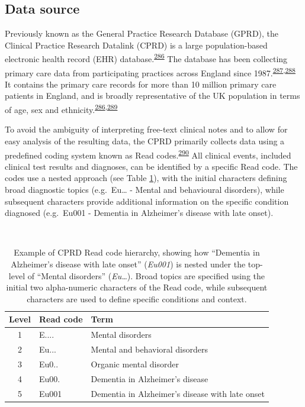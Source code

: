 \documentclass[a4paper, twoside]{templates/ociamthesis}
\begin{document}
\hypertarget{cprd-data-source}{%
\subsection{Data source}\label{cprd-data-source}}

Previously known as the General Practice Research Database (GPRD), the Clinical Practice Research Datalink (CPRD) is a large population-based electronic health record (EHR) database.\textsuperscript{\protect\hyperlink{ref-herrett2015}{286}} The database has been collecting primary care data from participating practices across England since 1987.\textsuperscript{\protect\hyperlink{ref-williams2012}{287},\protect\hyperlink{ref-wood2001revitalizing}{288}} It contains the primary care records for more than 10 million primary care patients in England, and is broadly representative of the UK population in terms of age, sex and ethnicity.\textsuperscript{\protect\hyperlink{ref-herrett2015}{286},\protect\hyperlink{ref-mathur2014}{289}}

To avoid the ambiguity of interpreting free-text clinical notes and to allow for easy analysis of the resulting data, the CPRD primarily collects data using a predefined coding system known as Read codes.\textsuperscript{\protect\hyperlink{ref-booth1994}{290}} All clinical events, included clinical test results and diagnoses, can be identified by a specific Read code. The codes use a nested approach (see Table \ref{tab:readExample-table}), with the initial characters defining broad diagnostic topics (e.g.~Eu\ldots{} - Mental and behavioural disorders), while subsequent characters provide additional information on the specific condition diagnosed (e.g.~Eu001 - Dementia in Alzheimer's disease with late onset).

~





\begin{table}[H]

\caption[Example of CPRD Read code hierarchy]{\label{tab:readExample-table}Example of CPRD Read code hierarchy, showing how ``Dementia in Alzheimer's disease with late onset'' (\emph{Eu001}) is nested under the top-level of ``Mental disorders'' (\emph{Eu\ldots{}}). Broad topics are specified using the initial two alpha-numeric characters of the Read code, while subsequent characters are used to define specific conditions and context.}
\centering
\begin{tabular}[t]{cll}
\toprule
\textbf{Level} & \textbf{Read code} & \textbf{Term}\\
\midrule
1 & E.... & Mental disorders\\
2 & Eu... & Mental and behavioral disorders\\
3 & Eu0.. & Organic mental disorder\\
4 & Eu00. & Dementia in Alzheimer's disease\\
5 & Eu001 & Dementia in Alzheimer's disease with late onset\\
\bottomrule
\end{tabular}
\end{table}
\end{document}
